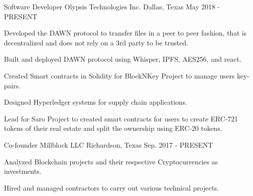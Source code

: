 

\begin{cventries}

  \cventry
    {Software Developer} %
    {Olypsis Technologies Inc.} %
    {Dallas, Texas} %
    {May 2018 - PRESENT} %
    {
      \begin{cvitems} %
        \item {Developed the DAWN protocol to transfer files in a peer to peer fashion, that is decentralized and does not rely on a 3rd party to be trusted.}
        \item {Built and deployed DAWN protocol using Whisper, IPFS, AES256, and react.}
        \item {Created Smart contracts in Solidity for BlockNKey Project to manage users key-pairs.}
        \item {Designed Hyperledger systems for supply chain applications.}
        \item {Lead for Saro Project to created smart contracts for users to create ERC-721 tokens of their real estate and split the ownership using ERC-20 tokens.}
      \end{cvitems}
    }

  \cventry
    {Co-founder} %
    {Millblock LLC} %
    {Richardson, Texas} %
    {Sep. 2017 - PRESENT} %
    {
      \begin{cvitems} %
        \item {Analyzed Blockchain projects and their respective Cryptocurrencies as investments.}
        \item {Hired and managed contractors to carry out various technical projects.}
      \end{cvitems}
    }


\end{cventries}
